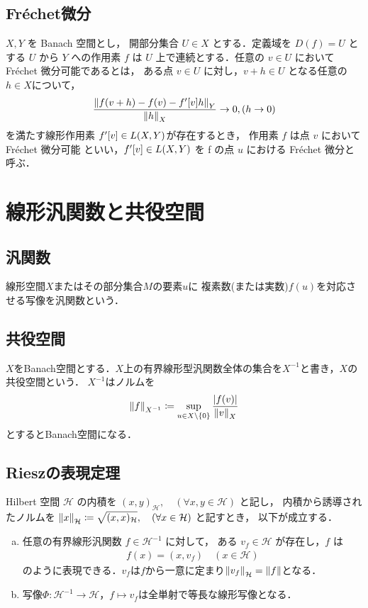 \subsection{Fr\'{e}chet微分}
\(X, Y\) を Banach 空間とし， 開部分集合 \(U \in X\) とする．定義域を \(D(f) = U\) とする \(U\) から \(Y\)
への作用素 \(f\) は \(U\) 上で連続とする．任意の \(v \in U\) において Fr\'{e}chet 微分可能であるとは， ある点
\(v \in U\) に対し，\(v + h \in U\) となる任意の\(h\in X\)について，
\begin{align}
    \dfrac{ \norm{ f(v+h) - f(v) - f'\qty[v]h }_Y }{\norm{h}_X}\rightarrow 0,(h\rightarrow 0)
\end{align}
を満たす線形作用素 \(f'\qty[v] \in L(X, Y ) \)が存在するとき， 作用素 \(f\) は点 \(v\) において Fr\'{e}chet 微分可能
といい，\( f'\qty[v] \in L(X,Y) \) を f の点 \(u\) における Fr\'{e}chet 微分と呼ぶ．

\section{線形汎関数と共役空間}

\subsection{汎関数}
線形空間\(X\)またはその部分集合\(M\)の要素\(u\)に
複素数(または実数)\(f(u)\)を対応させる写像を汎関数という．
\subsection{共役空間}
\(X\)をBanach空間とする．\(X\)上の有界線形型汎関数全体の集合を\(X^{-1}\)と書き，\(X\)の共役空間という．
\(X^{-1}\)はノルムを
\begin{align}
    \norm{f}_{X^{-1}}
    \coloneqq 
    \sup\limits_{u \in X \backslash \{ 0 \} }\dfrac{|f(v)|}{\norm{v}_X}
\end{align}
とするとBanach空間になる．
\subsection{Rieszの表現定理}
\begin{定理} 
  Hilbert 空間 \(\mathcal{H} \) の内積を 
  \( ( x, y)_{\mathcal{H}} ,\quad (\forall{x, y} \in \mathcal{H}) \) 
  と記し， 内積から誘導されたノルムを
  \(\norm{x}_\mathcal{H} \coloneqq \sqrt{( x, x )_{\mathcal{H}}},\quad(\forall x \in \mathcal{H}) \)
  と記すとき， 以下が成立する．
  \begin{enumerate}[(a)]
      \item 任意の有界線形汎関数 \(f \in \mathcal{H}^{-1}\) に対して， ある \(v_f \in \mathcal{H}\) が存在し，\(f\) は
      \begin{align}
          f(x)=( x,v_f ) \quad (x\in \mathcal{H})
      \end{align}
      のように表現できる．\(v_f\)は\(f\)から一意に定まり\(\norm{v_f}_\mathcal{H}=\norm{f}\)となる．
      \item 写像\(\Phi:\mathcal{H}^{-1}\rightarrow \mathcal{H}\)，\(f\mapsto v_f\)は全単射で等長な線形写像となる．
  \end{enumerate}
\end{定理}

